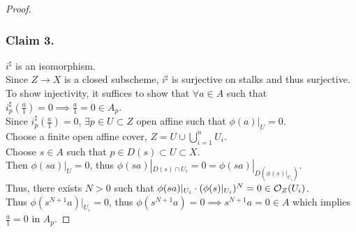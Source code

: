 \documentclass[../main.tex]{subfiles}
\begin{document}
\begin{proof}
\subsubsection*{Claim 3.}
$i^{\sharp}$ is an isomorphism.\\
Since $Z \to X$ is a closed subscheme, $i^{\sharp}$ is surjective on stalks and thus surjective.\\
To show injectivity, it suffices to show that $\forall a \in A$ such that $i_p^{\sharp}( \frac{a}{1}) =0 \implies \frac{a}{1}=0 \in A_p$.\\
Since $i_p^{\sharp}( \frac{a}{1}) =0$, $\exists p \in U \subset Z$ open affine such that $\phi( a) |_U=0$.\\
Choose a finite open affine cover, $Z= U \cup \bigcup_{i=1}^{n}U_i$.\\
Choose $s\in A$ such that $p \in D( s) \subset U \subset X$.\\
Then $\phi( sa) |_{U} =0$, thus $\phi( sa) |_{D( s) \cap U_i } =0= \phi( sa) |_{D( \phi( s) |_{U_i} ) } $.\\
Thus, there exists $N>0$ such that $\phi( sa) |_{U_i} \cdot ( \phi( s) |_{U_i} ) ^{N}= 0 \in \mathcal{O}_Z( U_i) $.\\
Thus $\phi( s^{N+1}a ) |_{U_i} =0$, thus $\phi( s^{N+1}a) =0 \implies s^{N+1}a = 0 \in A$ which implies $\frac{a}{1}=0$ in $A_p$.

	
\end{proof}
\end{document}
